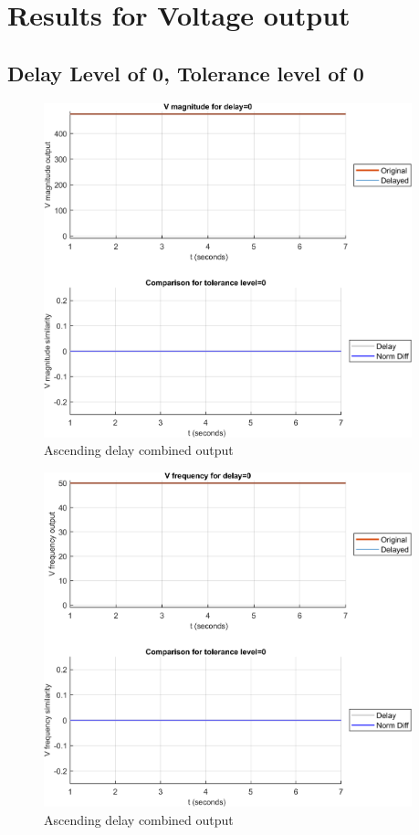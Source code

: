 \section{Results for Voltage output}

\subsection{Delay Level of 0, Tolerance level of 0}
\begin{figure}[hb]
    \includegraphics[width=0.95\textwidth]{PMUsim-figures/DelayOf_0/Zero_vMagnitude_0.png}    
    \caption{Ascending delay combined output}
    \label{fig:PMUsim_Zero_vMagnitude_0}
\end{figure}

\begin{figure}[hb]
    \includegraphics[width=0.95\textwidth]{PMUsim-figures/DelayOf_0/Zero_vFrequency_0.png}    
    \caption{Ascending delay combined output}
    \label{fig:PMUsim_Zero_vFrequency_0}
\end{figure}

